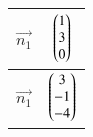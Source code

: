 \begin{tabular}{|c|c|}
\hline
$\vec{n_1}$ & $\begin{pmatrix}1\\3\\0\end{pmatrix}$\\
\hline
$\vec{n_1}$& $\begin{pmatrix}3\\-1\\-4\end{pmatrix}$\\
\hline
\end{tabular}
